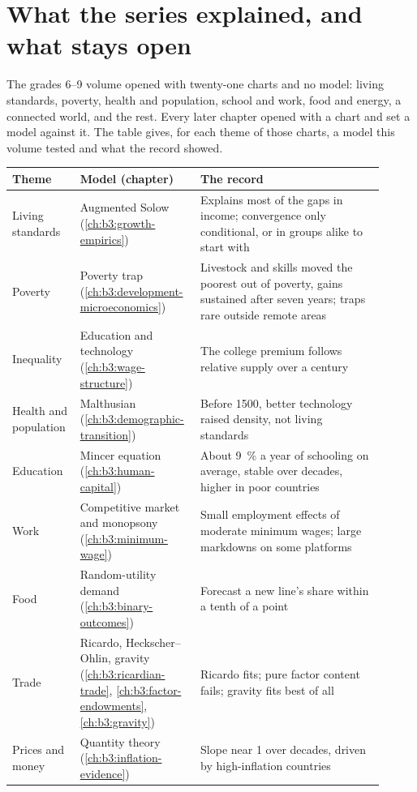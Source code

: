 \section{What the series explained, and what stays open}\label{sec:b3:income-and-wellbeing-evidence:return}

The grades 6--9 volume opened with twenty-one charts and no model: living
standards, poverty, health and population, school and work, food and energy, a
connected world, and the rest. Every later chapter opened with a chart and set a
model against it. The table gives, for each theme of those charts, a model this
volume tested and what the record showed.

\begin{center}
\small
\begin{tabular}{p{0.17\linewidth}p{0.27\linewidth}p{0.47\linewidth}}
  Theme & Model (chapter) & The record \\ \hline
  Living standards & Augmented Solow (\ref{ch:b3:growth-empirics}) & Explains most of the gaps in income; convergence only conditional, or in groups alike to start with \\
  Poverty & Poverty trap (\ref{ch:b3:development-microeconomics}) & Livestock and skills moved the poorest out of poverty, gains sustained after seven years; traps rare outside remote areas \\
  Inequality & Education and technology (\ref{ch:b3:wage-structure}) & The college premium follows relative supply over a century \\
  Health and population & Malthusian (\ref{ch:b3:demographic-transition}) & Before 1500, better technology raised density, not living standards \\
  Education & Mincer equation (\ref{ch:b3:human-capital}) & About 9~\% a year of schooling on average, stable over decades, higher in poor countries \\
  Work & Competitive market and monopsony (\ref{ch:b3:minimum-wage}) & Small employment effects of moderate minimum wages; large markdowns on some platforms \\
  Food & Random-utility demand (\ref{ch:b3:binary-outcomes}) & Forecast a new line's share within a tenth of a point \\
  Trade & Ricardo, Heckscher--Ohlin, gravity (\ref{ch:b3:ricardian-trade}, \ref{ch:b3:factor-endowments}, \ref{ch:b3:gravity}) & Ricardo fits; pure factor content fails; gravity fits best of all \\
  Prices and money & Quantity theory (\ref{ch:b3:inflation-evidence}) & Slope near 1 over decades, driven by high-inflation countries \\

\end{tabular}
\end{center}
